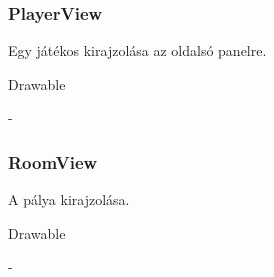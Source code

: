 \subsubsection{PlayerView}
\begin{class-template-responsibility}
    Egy játékos kirajzolása az oldalsó panelre.
\end{class-template-responsibility}
\begin{class-template-interface}
    Drawable
\end{class-template-interface}
\begin{class-template-baseclass}
    -
\end{class-template-baseclass}
\begin{class-template-attribute}
\end{class-template-attribute}
\begin{class-template-method}
    \classitem{}{}
\end{class-template-method}

\subsubsection{RoomView}
\begin{class-template-responsibility}
    A pálya kirajzolása.
\end{class-template-responsibility}
\begin{class-template-interface}
    Drawable
\end{class-template-interface}
\begin{class-template-baseclass}
    -
\end{class-template-baseclass}
\begin{class-template-attribute}
\end{class-template-attribute}
\begin{class-template-method}
\end{class-template-method}

